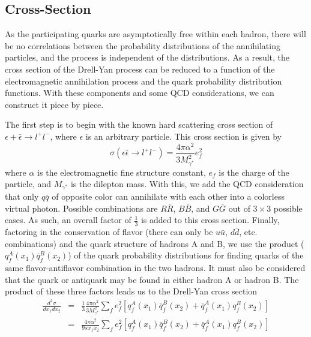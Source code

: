 \subsection{Cross-Section}

As the participating quarks are asymptotically free within each hadron, there will be no correlations between the probability distributions of the annihilating particles, and the process is independent of the distributions. As a result, the cross section of the Drell-Yan process can be reduced to a function of the electromagnetic annihilation process and the quark probability distribution functions. With these components and some QCD considerations, we can construct it piece by piece.

The first step is to begin with the known hard scattering cross section of $\epsilon + \bar{\epsilon} \rightarrow l^+ l^-$, where $\epsilon$ is an arbitrary particle. This cross section\cite{Halzen:1984mc} is given by
\begin{equation}
\sigma(\epsilon\bar{\epsilon}\rightarrow l^+l^-) = \frac{4 \pi \alpha^2}{3M_{\gamma^*}^2} e_f^2
\label{eq:annihilation-cross}
\end{equation}
where $\alpha$ is the electromagnetic fine structure constant, $e_f$ is the charge of the particle, and $M_{\gamma^*}$ is the dilepton mass. With this, we add the QCD consideration that only $q\bar{q}$ of opposite color can annihilate with each other into a colorless virtual photon. Possible combinations are $R\bar{R}$, $B\bar{B}$, and $G\bar{G}$ out of $3\times 3$ possible cases. As such, an overall factor of $\frac{1}{3}$ is added to this cross section. Finally, factoring in the conservation of flavor (there can only be $u\bar{u}$, $d\bar{d}$, etc. combinations) and the quark structure of hadrons A and B,  we use the product ($q_f^A(x_1)\bar{q}_{f}^B(x_2)$) of the quark probability distributions for finding quarks of the same flavor-antiflavor combination in the two hadrons. It must also be considered that the quark or antiquark may be found in either hadron A or hadron B. The product of these three factors leads us to the Drell-Yan cross section\cite{Drell:1970wh}
\begin{eqnarray}
\frac{d^2\sigma}{dx_1dx_2}&=&\frac{1}{3}\frac{4\pi\alpha^2}{3M_{\gamma^*}^2}
\sum_{f}e_f^2[q_f^A(x_1)\bar{q}_f^B(x_2)+
\bar{q}_f^A(x_1)q_f^B(x_2)]\\
&=&\frac{4\pi\alpha^2}{9 s x_1 x_2}
\sum_{f}e_f^2[q_f^A(x_1)\bar{q}_f^B(x_2)+
\bar{q}_f^A(x_1)q_f^B(x_2)]
\label{eq:DY-cross}
\end{eqnarray}

